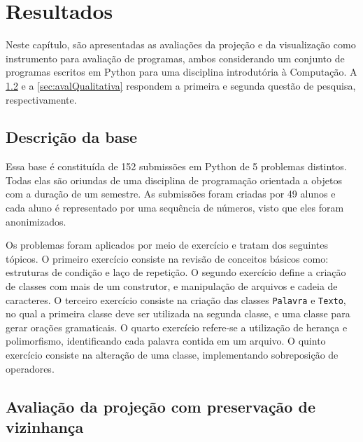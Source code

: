 \chapter{Resultados}
\label{chap:resultados}

	Neste capítulo, são apresentadas as avaliações da projeção e da visualização como
	instrumento para avaliação de programas, ambos considerando um conjunto de
	programas escritos em Python para uma disciplina introdutória à Computação. A
	\cref{sec:avalProjecao} e a \cref{sec:avalQualitativa} respondem a primeira e
	segunda questão de pesquisa, respectivamente.
	
	
	\section{Descrição da base}
	\label{sec:resultados:base-apoo}

		Essa base é constituída de 152 submissões em Python de 5 problemas distintos.
		Todas elas são oriundas de uma disciplina de programação orientada a objetos
		com a duração de um semestre. As submissões foram criadas por 49 alunos e
		cada aluno é representado por uma sequência de números, visto que eles foram
		anonimizados.
		
		Os problemas foram aplicados por meio de exercício e tratam dos seguintes
		tópicos. O primeiro exercício consiste na revisão
		de conceitos básicos como: estruturas de condição e laço de repetição. O segundo
		exercício define a criação de classes com mais de um construtor, e manipulação de
		arquivos e cadeia de caracteres. O terceiro exercício consiste na criação das classes
		\texttt{Palavra} e \texttt{Texto}, no qual a primeira classe deve ser utilizada na segunda
		classe, e uma classe para gerar orações gramaticais. O quarto exercício refere-se a
		utilização de herança e polimorfismo, identificando cada palavra contida em um arquivo. O
		quinto exercício consiste na alteração de uma classe, implementando sobreposição de
		operadores. 
		
	
	\section{Avaliação da projeção com preservação de vizinhança}
	\label{sec:avalProjecao}

